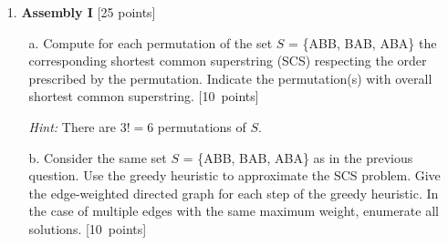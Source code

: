 \begin{enumerate}
\item[1.] \textbf{Assembly I} [25 points]

\begin{enumerate}
\item[a.] Compute for each permutation of the set $S$  = \{ABB, BAB, ABA\} the corresponding shortest common superstring (SCS) respecting the order prescribed by the permutation. Indicate the permutation(s) with overall shortest common superstring. [10~points]

\emph{Hint:} There are $3! = 6$ permutations of $S$.

\clearpage
\item[b.] Consider the same set $S$  = \{ABB, BAB, ABA\} as in the previous question. Use the greedy heuristic to approximate the SCS problem. Give the edge-weighted directed graph for each step of the greedy heuristic. In the case of multiple edges with the same maximum weight, enumerate all solutions. [10~points]



\end{enumerate}
\end{enumerate}
